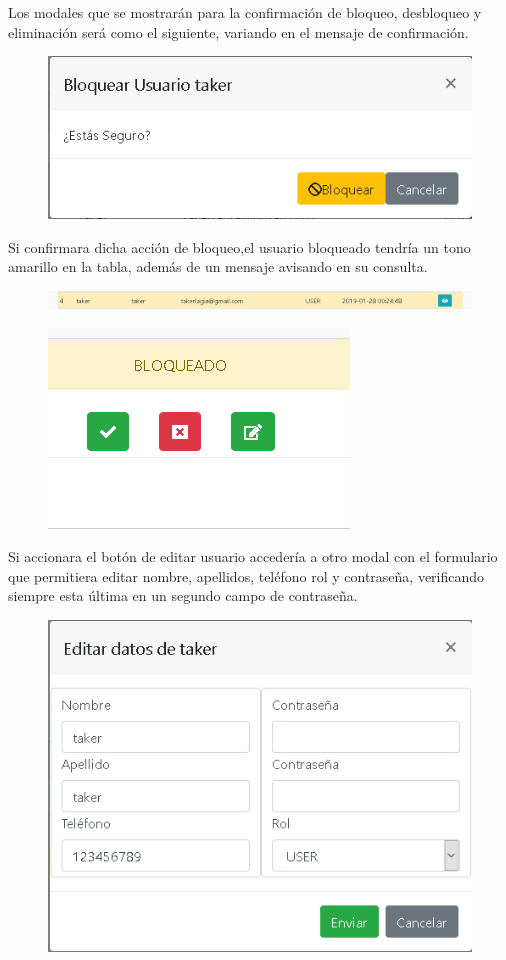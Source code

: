 Los modales que se mostrar\'{a}n para la confirmaci\'{o}n de bloqueo, desbloqueo y eliminaci\'{o}n ser\'{a} como el siguiente, variando en el mensaje de confirmaci\'{o}n.

\begin{figure}[h!]
\centering
\includegraphics[width=.6\textwidth]{Img/ManualUsuario/ADMIN_BLOCK_USER.png}
\end{figure}

Si confirmara dicha acci\'{o}n de bloqueo,el usuario bloqueado tendr\'{i}a un tono amarillo en la tabla, adem\'{a}s de un mensaje avisando en su consulta.

\begin{figure}[h!]
\centering
\includegraphics[width=1\textwidth]{Img/ManualUsuario/ADMIN_USER_BLOCKED.png}
\end{figure}

\begin{figure}[h!]
\centering
\includegraphics[width=.4\textwidth]{Img/ManualUsuario/ADMIN_BLOCKED_READ_USER.png}
\end{figure}

Si accionara el bot\'{o}n de editar usuario acceder\'{i}a a otro modal con el formulario que permitiera editar nombre, apellidos, tel\'{e}fono rol y contrase\~{n}a, verificando siempre esta \'{u}ltima en un segundo campo de contrase\~{n}a.


\begin{figure}[h!]
\centering
\includegraphics[width=.4\textwidth]{Img/ManualUsuario/ADMIN_EDIT_USER.png}
\end{figure}
